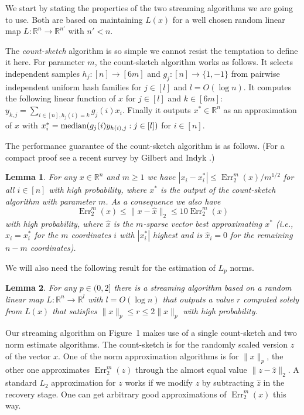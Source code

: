 \documentclass[9pt,letterpaper]{article}
\newtheorem{lemma}{Lemma}
\theoremstyle{remark}
\DeclareMathOperator{\err}{Err}
\begin{document}
We start by stating the properties of the two streaming algorithms we are
going to use. Both are based on maintaining $L(x)$
for a well chosen random linear map
$L:\mathbb R^n\to\mathbb R^{n'}$ with $n'<n$.

The {\em count-sketch} algorithm \cite{CharikarCF04} is so simple we cannot resist the
temptation to define it here. For parameter $m$, the count-sketch algorithm
works as follows. It selects independent samples $h_j:[n]\to[6m]$ and
$g_j:[n]\to\{1,-1\}$ from pairwise independent uniform hash families for
$j\in[l]$ and $l=O(\log n)$. It computes the following linear function of $x$
for $j\in[l]$ and $k\in[6m]$:
$y_{k,j}=\sum_{i\in[n],h_j(i)=k}g_j(i)x_i$. Finally it outputs
$x^*\in\mathbb R^n$ as an approximation of $x$ with
$x^*_i=\hbox{median}(g_j(i)y_{h(i),j}:j\in[l])$ for $i\in[n]$.

The performance guarantee of the count-sketch algorithm is as follows.
(For a compact proof see a recent survey by Gilbert and Indyk \cite{GilbertI10}.) 

\begin{lemma}\label{c-s}{\rm\cite{CharikarCF04}}
For any $x\in\mathbb R^n$ and $m\ge1$ we have
$|x_i-x^*_i|\le\err_2^m(x)/m^{1/2}$
for all $i\in[n]$ with high probability,
where $x^*$ is the output of the count-sketch algorithm with parameter $m$.
As a consequence we also have
$$\err_2^m(x)\le\|x-\hat x\|_2\le10\err_2^m(x)$$
with high probability, where $\hat x$ is the
$m$-sparse vector best approximating $x^*$ (i.e., $\hat x_i=x^*_i$ for the
$m$ coordinates $i$ with $|x^*_i|$ highest and is $\hat x_i=0$ for the
remaining $n-m$ coordinates).
\end{lemma}

We will also need the following result for the estimation of $L_p$ norms.

\begin{lemma}\label{norm}{\rm\cite{KaneNPW}}
For any $p\in(0,2]$ there is a streaming algorithm based on a random linear
map $L:\mathbb R^n\to\mathbb R^l$ with $l=O(\log n)$ that outputs a value $r$
computed solely from $L(x)$ that satisfies
$\|x\|_p\le r\le2\|x\|_p$
with high probability.
\end{lemma}

Our streaming algorithm on Figure~1 makes use of a single count-sketch and two
norm estimate algorithms. The count-sketch is for the randomly scaled version
$z$ of the vector $x$. One of the norm approximation algorithms is for
$\|x\|_p$, the other one approximates $\err_2^m(z)$ through the almost equal
value $\|z-\hat z\|_2$. A standard $L_2$ approximation for $z$ works if we
modify $z$ by subtracting $\hat z$ in the recovery stage. One can get
arbitrary good approximations of $\err_2^m(x)$ this way.
\end{document}
